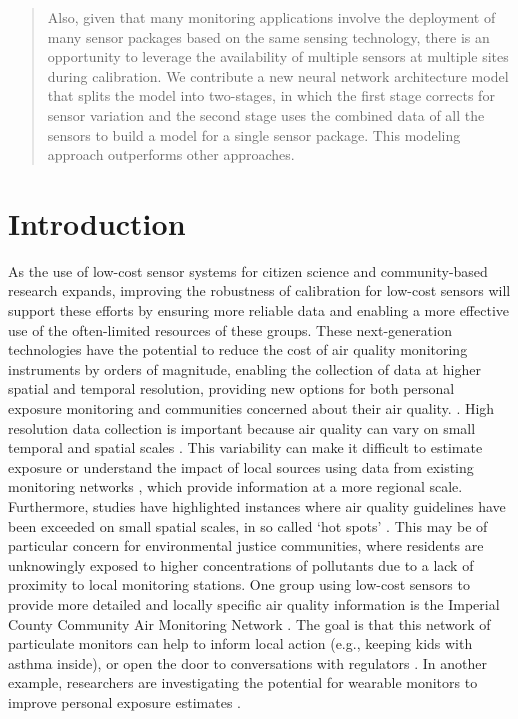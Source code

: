 \documentclass[journal abbreviation, manuscript]{copernicus}
\begin{document}
\begin{abstract}
Also, given that many monitoring applications involve the deployment of many sensor packages based on the same sensing technology, there is an opportunity to leverage the availability of multiple sensors at multiple sites during calibration.  We contribute a new neural network architecture model that splits the model into two-stages, in which the first stage corrects for sensor variation and the second stage uses the combined data of all the sensors to build a model for a single sensor package.  This modeling approach outperforms other approaches.


\end{abstract}

\section{Introduction}\label{Introduction}

As the use of low-cost sensor systems for citizen science and community-based research expands, improving the robustness of calibration for low-cost sensors will support these efforts by ensuring more reliable data and enabling a more effective use of the often-limited resources of these groups. These next-generation technologies have the potential to reduce the cost of air quality monitoring instruments by orders of magnitude, enabling the collection of data at higher spatial and temporal resolution, providing new options for both personal exposure monitoring and communities concerned about their air quality. \citep{Snyder2013}.  High resolution data collection is important because air quality can vary on small temporal and spatial scales \citep{Monn1997, Wheeler2008}. This variability can make it difficult to estimate exposure or understand the impact of local sources using data from existing monitoring networks \citep{Wilson2005}, which provide information at a more regional scale. Furthermore, studies have highlighted instances where air quality guidelines have been exceeded on small spatial scales, in so called ‘hot spots’ \citep{Wu2012}. This may be of particular concern for environmental justice communities, where residents are unknowingly exposed to higher concentrations of pollutants due to a lack of proximity to local monitoring stations. One group using low-cost sensors to provide more detailed and locally specific air quality information is the Imperial County Community Air Monitoring Network \citep{English2016}. The goal is that this network of particulate monitors can help to inform local action (e.g., keeping kids with asthma inside), or open the door to conversations with regulators \citep{English2016}. In another example, researchers are investigating the potential for wearable monitors to improve personal exposure estimates \citep{Jerrett2017}. 
\end{document}
